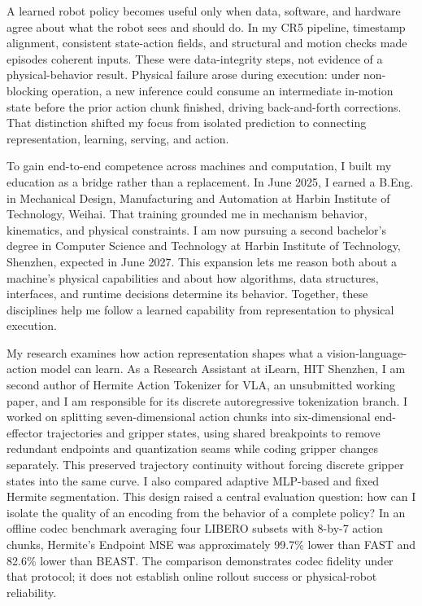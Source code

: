 A learned robot policy becomes useful only when data, software, and hardware agree about what the robot sees and should do. In my CR5 pipeline, timestamp alignment, consistent state-action fields, and structural and motion checks made episodes coherent inputs. These were data-integrity steps, not evidence of a physical-behavior result. Physical failure arose during execution: under non-blocking operation, a new inference could consume an intermediate in-motion state before the prior action chunk finished, driving back-and-forth corrections. That distinction shifted my focus from isolated prediction to connecting representation, learning, serving, and action.

To gain end-to-end competence across machines and computation, I built my education as a bridge rather than a replacement. In June 2025, I earned a B.Eng. in Mechanical Design, Manufacturing and Automation at Harbin Institute of Technology, Weihai. That training grounded me in mechanism behavior, kinematics, and physical constraints. I am now pursuing a second bachelor's degree in Computer Science and Technology at Harbin Institute of Technology, Shenzhen, expected in June 2027. This expansion lets me reason both about a machine's physical capabilities and about how algorithms, data structures, interfaces, and runtime decisions determine its behavior. Together, these disciplines help me follow a learned capability from representation to physical execution.

My research examines how action representation shapes what a vision-language-action model can learn. As a Research Assistant at iLearn, HIT Shenzhen, I am second author of Hermite Action Tokenizer for VLA, an unsubmitted working paper, and I am responsible for its discrete autoregressive tokenization branch. I worked on splitting seven-dimensional action chunks into six-dimensional end-effector trajectories and gripper states, using shared breakpoints to remove redundant endpoints and quantization seams while coding gripper changes separately. This preserved trajectory continuity without forcing discrete gripper states into the same curve. I also compared adaptive MLP-based and fixed Hermite segmentation. This design raised a central evaluation question: how can I isolate the quality of an encoding from the behavior of a complete policy? In an offline codec benchmark averaging four LIBERO subsets with 8-by-7 action chunks, Hermite's Endpoint MSE was approximately 99.7\% lower than FAST and 82.6\% lower than BEAST. The comparison demonstrates codec fidelity under that protocol; it does not establish online rollout success or physical-robot reliability.

